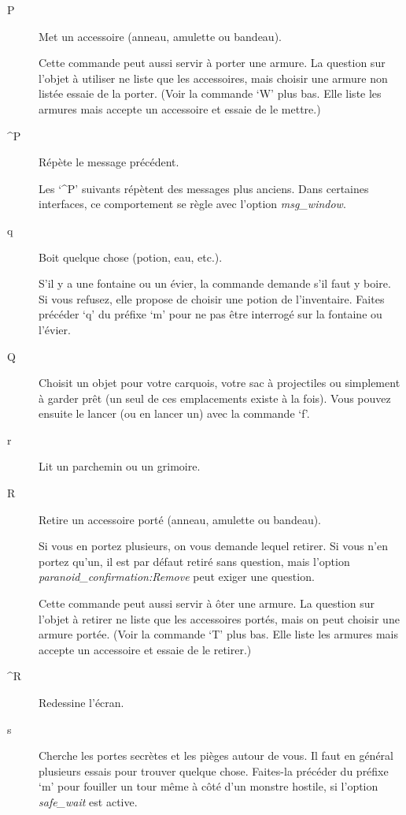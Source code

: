 \documentclass[titlepage]{article}
\begin{document}
\begin{description}
\item[{P}]
Met un accessoire (anneau, amulette ou bandeau).


Cette commande peut aussi servir à porter une armure.
La question sur l'objet à utiliser ne liste que les accessoires, mais
choisir une armure non listée essaie de la porter.
(Voir la commande `W' plus bas.
Elle liste les armures mais accepte un accessoire et essaie de le mettre.)

\item[{\textasciicircum{}P}]
Répète le message précédent.


Les `\textasciicircum{}P' suivants répètent des messages plus anciens.
Dans certaines interfaces, ce comportement se règle avec l'option
\textit{msg\_window}.

\item[{q}]
Boit quelque chose (potion, eau, etc.).


S'il y a une fontaine ou un évier, la commande demande s'il faut y boire.
Si vous refusez, elle propose de choisir une potion de l'inventaire.
Faites précéder `q' du préfixe `m' pour ne pas être interrogé
sur la fontaine ou l'évier.

\item[{Q}]
Choisit un objet pour votre carquois, votre sac à projectiles ou
simplement à garder prêt (un seul de ces emplacements existe à la fois).
Vous pouvez ensuite le lancer (ou en lancer un) avec la commande `f'.

\item[{r}]
Lit un parchemin ou un grimoire.

\item[{R}]
Retire un accessoire porté (anneau, amulette ou bandeau).


Si vous en portez plusieurs, on vous demande lequel retirer.
Si vous n'en portez qu'un, il est par défaut retiré sans question, mais
l'option
\textit{paranoid\_confirmation:Remove}
peut exiger une question.


Cette commande peut aussi servir à ôter une armure.
La question sur l'objet à retirer ne liste que les accessoires portés, mais
on peut choisir une armure portée.
(Voir la commande `T' plus bas.
Elle liste les armures mais accepte un accessoire et essaie de le
retirer.)

\item[{\textasciicircum{}R}]
Redessine l'écran.

\item[{s}]
Cherche les portes secrètes et les pièges autour de vous.
Il faut en général plusieurs essais pour trouver quelque chose.
Faites-la précéder du préfixe `m' pour fouiller un tour même à côté
d'un monstre hostile, si l'option
\textit{safe\_wait}
est active.



\end{description}
\end{document}
